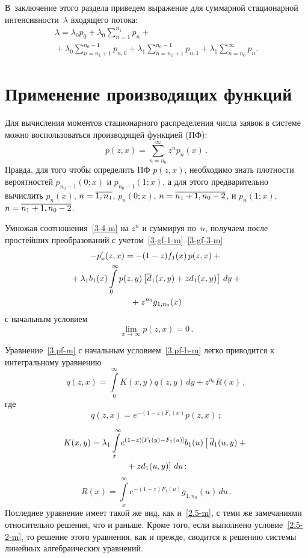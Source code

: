 \begin{multicols}{2}
В~заключение этого раздела приведем выражение для
суммарной стационарной интенсивности~$\lambda$ входящего
потока:
\begin{multline}
\label{inten-1-m}
\lambda = \lambda_0 p_0 + \lambda_0 \sum\limits_{n=1}^{n_1}
p_n +{}\\
\!\!{}+ \lambda_0 \sum\limits_{n=n_1+1}^{n_0-1} p_{n,0}
+ \lambda_1 \sum\limits_{n=n_1+1}^{n_0-1} p_{n,1}
+ \lambda_1 \sum\limits_{n=n_0}^{\infty} p_n .\!\!
\end{multline}

\section{Применение производящих функций}

Для вычисления моментов стационарного распределения
числа заявок в системе можно воспользоваться производящей функцией (ПФ):
$$
p(z,x) = \sum\limits_{n=n_0}^\infty z^n p_n(x)\,.
$$
Правда, для того чтобы определить ПФ $p(z,x)$,
необходимо знать плотности вероятностей $p_{n_0-1}(0;x)$
и $p_{n_0-1}(1;x)$, а для этого предварительно вы\-чис\-лить
$p_{n}(x)$, $n\hm=\overline{1,n_1}$, $p_{n}(0;x)$, $n\hm=\overline{n_1+1,n_0-2}$, и
$p_{n}(1;x)$, $n\hm=\overline{n_1+1,n_0-2}$.

Умножая соотношения~\eqref{3-4-m} на $z^n$ и суммируя по~$n$, 
получаем после простейших преобразований с
учетом~\eqref{3-gf-1-m}--\eqref{3-gf-3-m}
\begin{multline}
\label{3.pf-m}
- p'_{x}(z,x) = - (1-z) f_1(x)\, p(z,x) +{}\\
{}+ \lambda_1 b_1(x)
\int\limits_0^\infty p(z,y) \left[\overline d_1(x,y) + z d_1(x,y)\right]\, dy
+{}\\
{}+
z^{n_0} g_{1,n_0}(x) 
\end{multline}
с начальным условием
\begin{equation}
\label{3.pf-b-m}
\lim_{x\to\infty} p(z,x) = 0\,.
\end{equation}

Уравнение~\eqref{3.pf-m} с начальным условием~\eqref{3.pf-b-m} легко приводится к интегральному
уравнению
\begin{equation*}
q(z,x) = \int\limits_0^\infty K(x,y) q(z,y)\, dy
+ z^{n_0} R(x)\,,
\end{equation*}
где
$$
q(z,x) = e^{-(1-z) F_1(x)} p(z,x)\,;
$$

\vspace*{-12pt}

\noindent
\begin{multline*}
K(x,y) = \lambda_1 \int\limits_x^\infty\! e^{(1-z) \left[F_1(y) - F_1(u)\right]}
b_1(u) \left[\,\overline d_1(u,y) +{}\right.\\
\left.{}+ z d_1(u,y)\right]\, du\,;
\end{multline*}
$$
R(x) = \int\limits_x^\infty e^{-(1-z) F_1(u)} g_{1,n_0}(u)\, du\,.
$$
Последнее уравнение имеет такой же вид, как и~\eqref{2.5-m},
с теми же замечаниями относительно решения, что и раньше.
Кроме того, если выполнено условие~\eqref{2.5-2-m},
то решение этого уравнения, как и прежде, сводится
к решению системы линейных алгебраических уравнений.


\end{multicols}
